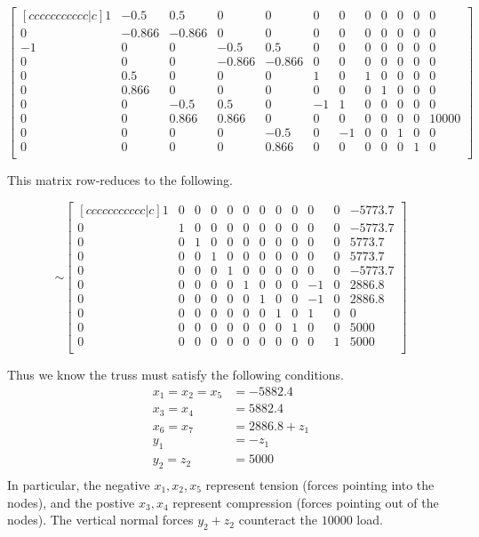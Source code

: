 \begin{applicationActivities}
\begin{observation}

\[
\begin{bmatrix}[ccccccccccc|c]
1&-0.5&0.5&0&0&0&0&0&0&0&0&0\\
0&-0.866&-0.866&0&0&0&0&0&0&0&0&0\\
-1&0&0&-0.5&0.5&0&0&0&0&0&0&0\\
0&0&0&-0.866&-0.866&0&0&0&0&0&0&0\\
0&0.5&0&0&0&1&0&1&0&0&0&0\\
0&0.866&0&0&0&0&0&0&1&0&0&0\\
0&0&-0.5&0.5&0&-1&1&0&0&0&0&0\\
0&0&0.866&0.866&0&0&0&0&0&0&0&10000\\
0&0&0&0&-0.5&0&-1&0&0&1&0&0\\
0&0&0&0&0.866&0&0&0&0&0&1&0\\
\end{bmatrix}
\]
\end{observation}

\begin{observation}
This matrix row-reduces to the following.


\[\sim
\begin{bmatrix}[ccccccccccc|c]
1&0&0&0&0&0&0&0&0&0&0&-5773.7\\
0&1&0&0&0&0&0&0&0&0&0&-5773.7\\
0&0&1&0&0&0&0&0&0&0&0&5773.7\\
0&0&0&1&0&0&0&0&0&0&0&5773.7\\
0&0&0&0&1&0&0&0&0&0&0&-5773.7\\
0&0&0&0&0&1&0&0&0&-1&0&2886.8\\
0&0&0&0&0&0&1&0&0&-1&0&2886.8\\
0&0&0&0&0&0&0&1&0&1&0&0\\
0&0&0&0&0&0&0&0&1&0&0&5000\\
0&0&0&0&0&0&0&0&0&0&1&5000\\
\end{bmatrix}
\]
\end{observation}
\begin{observation}
\drawtruss{\trussCompletion}

Thus we know the truss must satisfy the following conditions.
\begin{align*}
x_1=x_2=x_5&=-5882.4 \\
x_3=x_4&=5882.4\\
x_6=x_7&=2886.8+z_1\\
y_1&=-z_1\\
y_2=z_2&=5000 \\
\end{align*}
In particular, the negative \(x_1,x_2,x_5\) represent tension (forces pointing into the nodes),
and the postive \(x_3,x_4\) represent compression (forces pointing out of the nodes).
The vertical normal forces \(y_2+z_2\) counteract the \(10000\) load.

\end{observation}



\end{applicationActivities}
